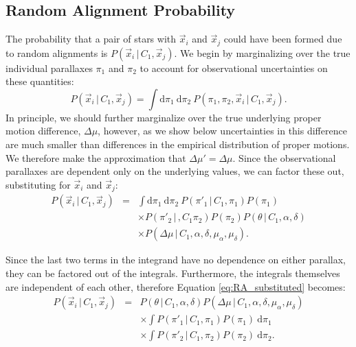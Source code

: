 \documentclass[usenatbib]{mnras}
\newcommand{\given}{\,|\,}
\newcommand{\dd}{\mathrm{d}}
\begin{document}
\subsection{Random Alignment Probability}

The probability that a pair of stars with $\vec{x}_i$ and $\vec{x}_j$ could have been formed due to random alignments is $P(\vec{x}_i \given C_1, \vec{x}_j)$. We begin by marginalizing over the true individual parallaxes $\pi_1$ and $\pi_2$ to account for observational uncertainties on these quantities:
\begin{equation}
P(\vec{x}_i \given C_1, \vec{x}_j) = %
\int \dd \pi_1\ \dd \pi_2\ P(\pi_1, \pi_2, \vec{x}_i \given C_1, \vec{x}_j).
\end{equation}
In principle, we should further marginalize over the true underlying proper motion difference, $\Delta \mu$, however, as we show below uncertainties in this difference are much smaller than differences in the empirical distribution of proper motions. We therefore make the approximation that $\Delta \mu' = \Delta \mu$. Since the observational parallaxes are dependent only on the underlying values, we can factor these out, substituting for $\vec{x}_i$ and $\vec{x}_j$:
\begin{eqnarray}
P(\vec{x}_i \given C_1, \vec{x}_j) &=& \int  \dd \pi_1\ \dd \pi_2\ P(\pi'_1 \given C_1, \pi_1) P(\pi_1) \nonumber \\
	& &  \times P(\pi'_2 \given, C_1 \pi_2) P(\pi_2) P(\theta \given C_1, \alpha, \delta) \nonumber \\
	& &  \times  P(\Delta \mu \given C_1, \alpha, \delta, \mu_{\alpha}, \mu_{\delta}). \label{eq:RA_substituted}
\end{eqnarray}

Since the last two terms in the integrand have no dependence on either parallax, they can be factored out of the integrals. Furthermore, the integrals themselves are independent of each other, therefore Equation \ref{eq:RA_substituted} becomes:
\begin{eqnarray}
P(\vec{x}_i \given C_1, \vec{x}_j) &=& P(\theta \given C_1, \alpha, \delta) P(\Delta \mu \given C_1, \alpha, \delta, \mu_{\alpha}, \mu_{\delta}) \nonumber \\
	& &  \times \int  P(\pi'_1 \given C_1, \pi_1) P(\pi_1)\ \dd \pi_1 \nonumber \\
	& &  \times \int  P(\pi'_2 \given C_1, \pi_2) P(\pi_2)\ \dd \pi_2. \label{eq:RA_factored}
\end{eqnarray}
\end{document}
